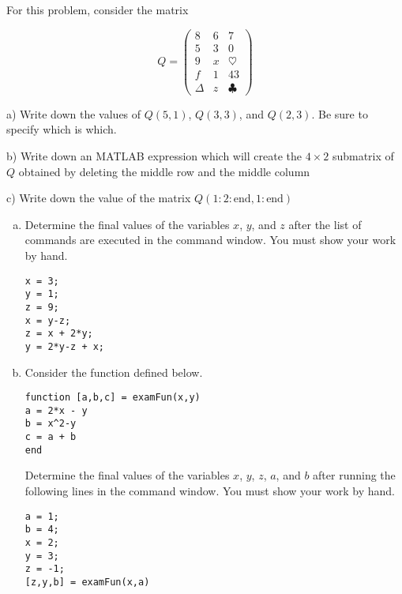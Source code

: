 \documentclass[11pt]{exam}
\theoremstyle{definition}
\begin{document}
\begin{questions}

\addpoints

\question[10]\mbox{}

For this problem, consider the matrix

$$Q = \left(\begin{array}{ccc}
  8 &  6 & 7\\
  5 &  3 & 0\\
  9 &  x & \heartsuit\\
  f &  1 & 43\\
 \Delta & z &  \clubsuit
\end{array}\right)$$

a) Write down the values of $Q(5,1)$, $Q(3,3)$, and $Q(2,3)$.  Be sure to specify which is which.

b) Write down an MATLAB expression which will create the $4\times 2$ submatrix of $Q$ obtained by deleting the middle row and the middle column

c) Write down the value of the matrix $Q(1:2:\text{end},1:\text{end})$

\newpage
\question[10]\mbox{}

\begin{enumerate}[(a)]
\item Determine the final values of the variables $x$, $y$, and $z$ after the list of commands are executed in the command window.
You must show your work by hand.

\begin{lstlisting}
x = 3;
y = 1;
z = 9;
x = y-z;
z = x + 2*y;
y = 2*y-z + x;
\end{lstlisting}

\vspace{2in}
\item Consider the function defined below.

\begin{lstlisting}
function [a,b,c] = examFun(x,y)
a = 2*x - y
b = x^2-y
c = a + b
end
\end{lstlisting}

Determine the final values of the variables $x$, $y$, $z$, $a$, and $b$ after running the following lines in the command window.  You must show your work by hand.

\begin{lstlisting}
a = 1;
b = 4;
x = 2;
y = 3;
z = -1;
[z,y,b] = examFun(x,a)
\end{lstlisting}

\end{enumerate}


\end{questions}
\end{document}
